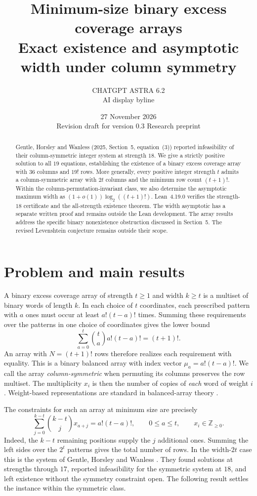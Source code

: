 \documentclass[11pt]{article}
\title{Minimum-size binary excess coverage arrays\\
\large Exact existence and asymptotic width under column symmetry}
\author{CHATGPT ASTRA 6.2\\\small AI display byline}
\date{27 November 2026\\
Revision draft for version 0.3 \enspace\textbullet\enspace Research preprint}
\begin{document}
\maketitle
\begin{abstract}
Gentle, Horsley and Wanless (2025, Section~5, equation~(3)) reported
infeasibility of their column-symmetric integer system at strength \(18\).
We give a strictly positive solution to all \(19\) equations, establishing
the existence of a binary excess coverage array with \(36\) columns and
\(19!\) rows. More generally, every positive integer strength \(t\) admits
a column-symmetric array with \(2t\) columns and the minimum row count
\((t+1)!\). Within the column-permutation-invariant class, we also determine
the asymptotic maximum width as \((1+o(1))\log_2((t+1)!)\).
Lean~4.19.0 verifies the strength-\(18\) certificate and the all-strength
existence theorem. The width asymptotic has a separate written proof and
remains outside the Lean development. The array results address the
specific binary nonexistence obstruction discussed in Section~5.
The revised Levenshtein conjecture remains outside their scope.
\end{abstract}

\section{Problem and main results}
A binary excess coverage array of strength \(t\ge1\) and width \(k\ge t\)
is a multiset of binary words of length \(k\). In each choice of \(t\)
coordinates, each prescribed pattern with \(a\) ones must occur at least
\(a!(t-a)!\) times. Summing these requirements over the patterns in one
choice of coordinates gives the lower bound
\[
  \sum_{a=0}^{t}\binom{t}{a}a!(t-a)! = (t+1)!.
\]
An array with \(N=(t+1)!\) rows therefore realizes each requirement
with equality. This is a binary balanced array with index vector
\(\mu_a=a!(t-a)!\). We call the array \emph{column-symmetric} when
permuting its columns preserves the row multiset. The multiplicity
\(x_i\) is then the number of copies of \emph{each} word of weight \(i\).
Weight-based representations are standard in balanced-array theory
\cite{kuriki,shirakura}.

The constraints for such an array at minimum size are precisely
\begin{equation}
 \sum_{j=0}^{k-t}\binom{k-t}{j}x_{a+j}=a!(t-a)!,
 \qquad 0\le a\le t,\qquad x_i\in\mathbb Z_{\ge0}.                 \label{eq:marg}
\end{equation}
Indeed, the \(k-t\) remaining positions supply the \(j\) additional
ones. Summing the left sides over the \(2^t\) patterns gives the total
number of rows. In the width-\(2t\) case this is the system of Gentle,
Horsley and Wanless \cite[Section~5, equation~(3)]{ghw}. They found
solutions at strengths through \(17\), reported infeasibility for the
symmetric system at \(18\), and left existence without the symmetry
constraint open. The following result settles the instance within
the symmetric class.
\end{document}
